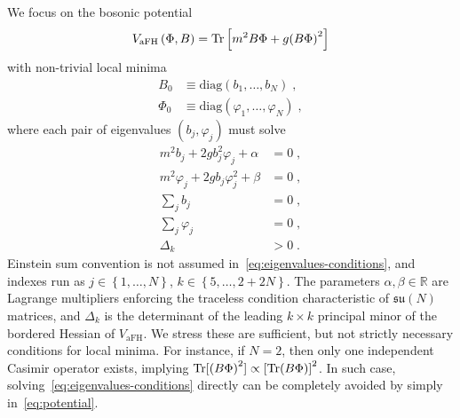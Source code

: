 \documentclass[../main.tex]{subfiles}
\begin{document}
We focus on the bosonic potential
\begin{equation}%
  \label{eq:potential}
  V_{\text{aFH}} \left(\Phi, B\right) = \tr \left[m^2 B \Phi + g {( B \Phi )}^2\right]
\end{equation}
with non-trivial local minima
\begin{subequations}%
  \label{eq:minima}
  \begin{align}
    B_0    & \equiv \mathrm{diag} \left(b_1, \ldots, b_N \right) \;,             \\
    \Phi_0 & \equiv \mathrm{diag} \left(\varphi_1, \ldots, \varphi_N \right) \;,
  \end{align}
\end{subequations}
where each pair of eigenvalues $(b_j, \varphi_j)$ must solve
\begin{subequations}%
  \label{eq:eigenvalues-conditions}
  \begin{align}
    m^2 b_j + 2g b_j^2 \varphi_j +\alpha        & = 0 \;,  \\
    m^2 \varphi_j + 2g b_j \varphi_j^2  + \beta & = 0 \;,  \\
    \textstyle\sum_{j} b_j                      & = 0 \;,  \\
    \textstyle \sum_j \varphi_j                 & = 0 \;,  \\
    \Delta_k                                    & > 0  \;.
  \end{align}
\end{subequations}
Einstein sum convention is not assumed in~\eqref{eq:eigenvalues-conditions}, and indexes run as $j \in \left\{ 1, \ldots, N \right\} $, $k \in \left\{ 5, \ldots, 2+2N \right\} $. The parameters $\alpha, \beta \in \mathbb{R}$ are Lagrange multipliers enforcing the traceless condition characteristic of $\mathfrak{su}(N)$ matrices, and $\Delta_k$ is the determinant of the leading $k \times k $ principal minor of the bordered Hessian of $V_{\text{aFH}}$. We stress these are sufficient, but not strictly necessary conditions for local minima. For instance, if $N=2$, then only one independent Casimir operator exists, implying $\operatorname{Tr} [ {(B \Phi)}^2 ] \propto { [ \operatorname{Tr}( B \Phi ) ] }^2$. In such case, solving~\eqref{eq:eigenvalues-conditions} directly can be completely avoided by simply  in~\eqref{eq:potential}.
\end{document}
